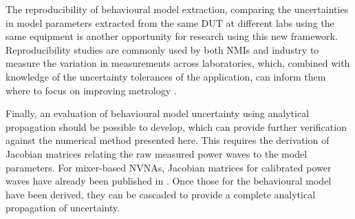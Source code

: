 \documentclass[../thesis/thesis.tex]{subfiles}
\begin{document}
\begin{refsection}
The reproducibility of behavioural model extraction, comparing the uncertainties in model parameters extracted from the same DUT at different labs using the same equipment is another opportunity for research using this new framework. Reproducibility studies are commonly used by both NMIs and industry to measure the variation in measurements across laboratories, which, combined with knowledge of the uncertainty tolerances of the application, can inform them where to focus on improving metrology \cite{ISO5725}. 

Finally, an evaluation of behavioural model uncertainty using analytical propagation should be possible to develop, which can provide further verification against the numerical method presented here. This requires the derivation of Jacobian matrices relating the raw measured power waves to the model parameters. For mixer-based NVNAs, Jacobian matrices for calibrated power waves have already been published in \cite{Lin_2012}. Once those for the behavioural model have been derived, they can be cascaded to provide a complete analytical propagation of uncertainty. 

\end{refsection}
\end{document}

